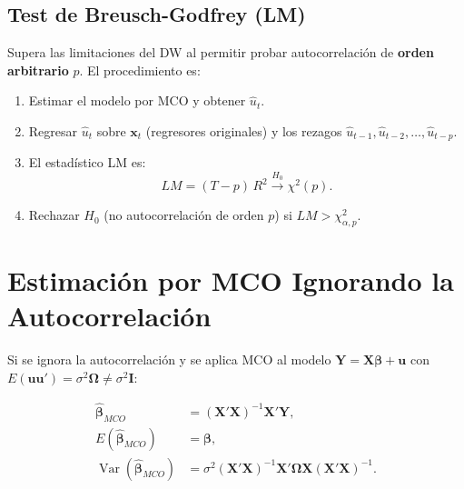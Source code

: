 \documentclass[12pt,a4paper]{article}
\theoremstyle{definition}
\theoremstyle{remark}
\begin{document}
\subsection{Test de Breusch-Godfrey (LM)}

Supera las limitaciones del DW al permitir probar autocorrelación de
\textbf{orden arbitrario} $p$. El procedimiento es:

\begin{enumerate}[label=\textbf{Paso \arabic*.}, leftmargin=3em, itemsep=5pt]
  \item Estimar el modelo por MCO y obtener $\hat{u}_t$.
  \item Regresar $\hat{u}_t$ sobre $\mathbf{x}_t$ (regresores originales)
        y los rezagos $\hat{u}_{t-1}, \hat{u}_{t-2}, \ldots, \hat{u}_{t-p}$.
  \item El estadístico LM es:
        \begin{equation}
          LM = (T - p)\,R^2 \xrightarrow{H_0} \chi^2(p).
          \label{eq:bg-lm}
        \end{equation}
  \item Rechazar $H_0$ (no autocorrelación de orden $p$) si
        $LM > \chi^2_{\alpha,p}$.
\end{enumerate}

\section{Estimación por MCO Ignorando la Autocorrelación}
\label{sec:estimacion-mco}

Si se ignora la autocorrelación y se aplica MCO al modelo
$\mathbf{Y} = \mathbf{X}\boldsymbol{\beta} + \mathbf{u}$ con
$E(\mathbf{u}\mathbf{u}') = \sigma^2\boldsymbol{\Omega} \neq
\sigma^2\mathbf{I}$:

\begin{align}
  \boldsymbol{\hat\beta}_{MCO}
    &= (\mathbf{X}'\mathbf{X})^{-1}\mathbf{X}'\mathbf{Y},
       \label{eq:beta-mco}\\
  E(\boldsymbol{\hat\beta}_{MCO})
    &= \boldsymbol{\beta}, \label{eq:insesgado}\\
  \operatorname{Var}(\boldsymbol{\hat\beta}_{MCO})
    &= \sigma^2(\mathbf{X}'\mathbf{X})^{-1}
       \mathbf{X}'\boldsymbol{\Omega}\mathbf{X}
       (\mathbf{X}'\mathbf{X})^{-1}. \label{eq:var-verdadera}
\end{align}
\end{document}
